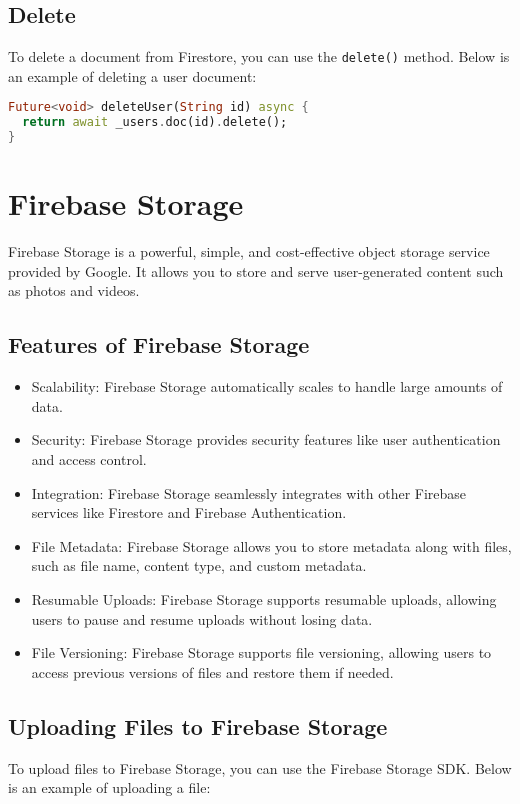 \documentclass[12pt]{article}
\begin{document}
\subsection{Delete}
To delete a document from Firestore, you can use the \texttt{delete()} method. Below is an example of deleting a user document:

\begin{lstlisting}[language=Dart, caption={Deleting a user document}]
Future<void> deleteUser(String id) async {
  return await _users.doc(id).delete();
}
\end{lstlisting}

\section{Firebase Storage}
Firebase Storage is a powerful, simple, and cost-effective object storage service provided by Google. It allows you to store and serve user-generated content such as photos and videos.

\subsection{Features of Firebase Storage}
\begin{itemize}
    \item Scalability: Firebase Storage automatically scales to handle large amounts of data.
    \item Security: Firebase Storage provides security features like user authentication and access control.
    \item Integration: Firebase Storage seamlessly integrates with other Firebase services like Firestore and Firebase Authentication.
    \item File Metadata: Firebase Storage allows you to store metadata along with files, such as file name, content type, and custom metadata.
    \item Resumable Uploads: Firebase Storage supports resumable uploads, allowing users to pause and resume uploads without losing data.
    \item File Versioning: Firebase Storage supports file versioning, allowing users to access previous versions of files and restore them if needed.
\end{itemize}

\subsection{Uploading Files to Firebase Storage}
To upload files to Firebase Storage, you can use the Firebase Storage SDK. Below is an example of uploading a file:
\end{document}
